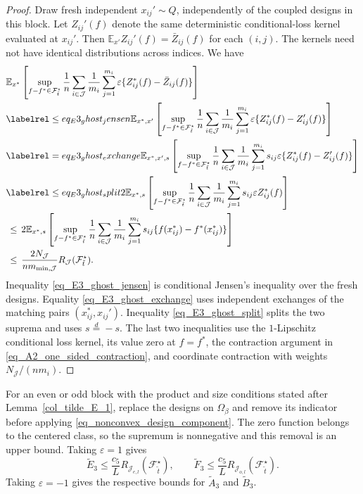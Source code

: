 \documentclass[twoside,11pt]{article}
\newenvironment{revision}{\color{revisionred}}{}
\begin{document}
\begin{revision}
\begin{proof}
Draw fresh independent $x_{ij}'\sim Q$, independently of the
coupled designs in this block. Let $Z_{ij}'(f)$ denote the same
deterministic conditional-loss kernel evaluated at $x_{ij}'$.
Then $\mathbb E_{x'}Z_{ij}'(f)=\bar Z_{ij}(f)$ for each $(i,j)$.
The kernels need not have identical distributions across indices.
We have
\begin{align*}
&\mathbb E_{x^*}\left[
\sup_{f-f^*\in\mathcal F_{\tilde t}^{\star}}
\frac1n\sum_{i\in\mathcal J}\frac1{m_i}\sum_{j=1}^{m_i}
\varepsilon\{Z_{ij}^*(f)-\bar Z_{ij}(f)\}\right]\\
&\labelrel\leq{eq_E3_ghost_jensen}
\mathbb E_{x^*,x'}\left[
\sup_{f-f^*\in\mathcal F_{\tilde t}^{\star}}
\frac1n\sum_{i\in\mathcal J}\frac1{m_i}\sum_{j=1}^{m_i}
\varepsilon\{Z_{ij}^*(f)-Z_{ij}'(f)\}\right]\\
&\labelrel={eq_E3_ghost_exchange}
\mathbb E_{x^*,x',s}\left[
\sup_{f-f^*\in\mathcal F_{\tilde t}^{\star}}
\frac1n\sum_{i\in\mathcal J}\frac1{m_i}\sum_{j=1}^{m_i}
s_{ij}\varepsilon\{Z_{ij}^*(f)-Z_{ij}'(f)\}\right]\\
&\labelrel\leq{eq_E3_ghost_split}
2\mathbb E_{x^*,s}\left[
\sup_{f-f^*\in\mathcal F_{\tilde t}^{\star}}
\frac1n\sum_{i\in\mathcal J}\frac1{m_i}\sum_{j=1}^{m_i}
s_{ij}\varepsilon Z_{ij}^*(f)\right]\\
&\,\leq\,
2\mathbb E_{x^*,s}\left[
\sup_{f-f^*\in\mathcal F_{\tilde t}^{\star}}
\frac1n\sum_{i\in\mathcal J}\frac1{m_i}\sum_{j=1}^{m_i}
s_{ij}\{f(x_{ij}^*)-f^*(x_{ij}^*)\}\right]\\
&\,\leq\,\frac{2N_{\mathcal J}}{n m_{\min,\mathcal J}}
R_{\mathcal J}(\mathcal F_{\tilde t}^{\star}).
\end{align*}
Inequality \eqref{eq_E3_ghost_jensen} is conditional Jensen's
inequality over the fresh designs. Equality
\eqref{eq_E3_ghost_exchange} uses independent exchanges of the
matching pairs $(x_{ij}^*,x_{ij}')$. Inequality
\eqref{eq_E3_ghost_split} splits the two suprema and uses
$s\stackrel d=-s$.
The last two inequalities use the $1$-Lipschitz conditional
loss kernel, its value zero at $f=f^*$, the contraction argument
in \eqref{eq_A2_one_sided_contraction}, and coordinate contraction
with weights $N_{\mathcal J}/(nm_i)$.
\end{proof}
For an even or odd block with the product and size conditions
stated after Lemma~\ref{col_tilde_E_1}, replace the designs on
$\Omega_\beta$ and remove its indicator before applying
\eqref{eq_nonconvex_design_component}. The zero function belongs
to the centered class, so the supremum is nonnegative and this
removal is an upper bound. Taking $\varepsilon=1$ gives
\[
\tilde E_3\leq\frac{c_5}{L}
R_{\mathcal J_{e,l}}(\mathcal F_{\tilde t}^{\star}),
\qquad
\tilde F_3\leq\frac{c_5}{L}
R_{\mathcal J_{o,l}}(\mathcal F_{\tilde t}^{\star}).
\]
Taking $\varepsilon=-1$ gives the respective bounds for
$\tilde A_3$ and $\tilde B_3$.
\end{revision}
\end{document}
